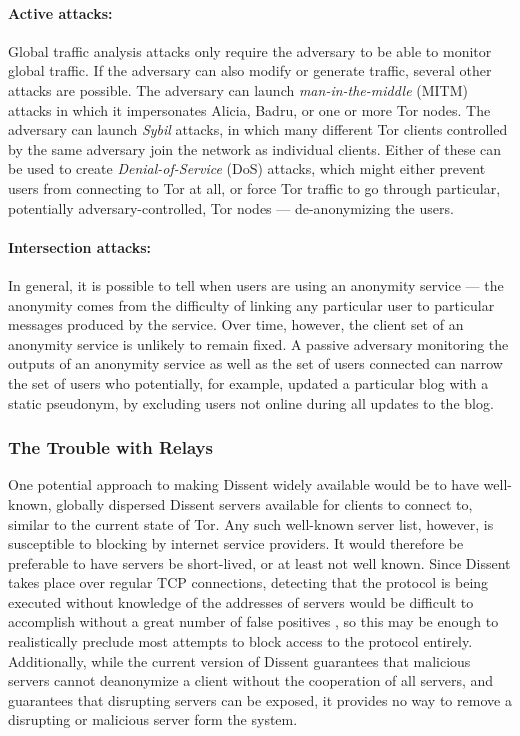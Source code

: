     \paragraph{Active attacks:}
    Global traffic analysis attacks only require the adversary to be able to
    monitor global traffic. If the adversary can also modify or generate
    traffic, several other attacks are possible. The adversary can launch
    \emph{man-in-the-middle} (MITM) attacks in which it impersonates Alicia,
    Badru, or one or more Tor nodes. The adversary can launch \emph{Sybil}
    attacks, in which many different Tor clients controlled by the same
    adversary join the network as individual clients. Either of these can be
    used to create \emph{Denial-of-Service} (DoS) attacks, which might either
    prevent users from connecting to Tor at all, or force Tor traffic to go
    through particular, potentially adversary-controlled, Tor nodes ---
    de-anonymizing the users.
    \paragraph{Intersection attacks:} In general,
    it is possible to tell when users are using an anonymity service --- the
    anonymity comes from the difficulty of linking any particular user to
    particular messages produced by the service. Over time, however, the client
    set of an anonymity service is unlikely to remain fixed. A passive
    adversary monitoring the outputs of an anonymity service as well as
    the set of users connected can narrow the set of users who
    potentially, for example, updated a particular blog with a static
    pseudonym, by excluding users  not online during all updates to the
    blog.

  \subsubsection{The Trouble with Relays}
  \label{Subsection:Relays}
    One potential approach to making Dissent widely available would be to have
    well-known, globally dispersed Dissent servers available for clients to
    connect to, similar to the current state of Tor. Any such well-known server
    list, however, is susceptible to blocking by internet service providers. It
    would therefore be preferable to have servers be short-lived, or at least
    not well known. Since Dissent takes place over regular TCP connections,
    detecting that the protocol is being executed without knowledge of the
    addresses of servers would be difficult to accomplish without a great number
    of false positives \cite{houmansadr_parrot_2013}, so this may be enough to
    realistically preclude most attempts to block access to the protocol
    entirely.  Additionally, while the current version of Dissent guarantees
    that malicious servers cannot deanonymize a client without the cooperation
    of all servers, and guarantees that disrupting servers can be exposed, it
    provides no way to remove a disrupting or malicious server form the system.

